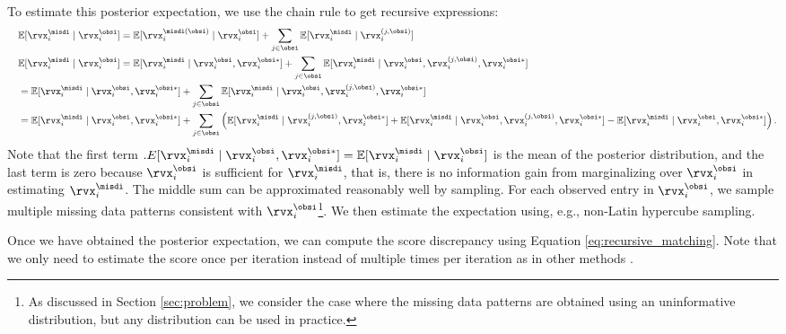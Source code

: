 \documentclass{article} %
\begin{document}
To estimate this posterior expectation, we use the chain rule to get recursive expressions:
\begin{align}
	& \quad \mathbb{E}[\rvx_{i}^{\misdi} \mid \rvx_{i}^{\obsi} ] = \mathbb{E}[\rvx_{i}^{\misdi(\obsi)} \mid \rvx_{i}^{\obsi}] + \sum_{j \in \obsi} \mathbb{E}[\rvx_{i}^{\misdi} \mid \rvx_{i}^{(j, \obsi)}] \label{eq:recursive_matching_posterior_expectation} \\ 
	&\quad \mathbb{E}[\rvx_{i}^{\misdi} \mid \rvx_{i}^{\obsi}] = \mathbb{E}[\rvx_{i}^{\misdi} \mid \rvx_{i}^{\obsi}, \rvx_{i}^{\obsi*} ] + \sum_{j \in \obsi} \mathbb{E}[\rvx_{i}^{\misdi} \mid \rvx_{i}^{\obsi}, \rvx_{i}^{(j, \obsi)},  \rvx_{i}^{\obsi*} ] \notag \\
    &\quad = \mathbb{E}[\rvx_{i}^{\misdi} \mid \rvx_{i}^{\obsi}, \rvx_{i}^{\obsi*} ] + \sum_{j \in \obsi}  \mathbb{E}[\rvx_{i}^{\misdi} \mid \rvx_{i}^{\obsi}, \rvx_{i}^{(j, \obsi)},  \rvx_{i}^{\obsi*} ] \notag \\
	&\quad = \mathbb{E}[\rvx_{i}^{\misdi} \mid \rvx_{i}^{\obsi}, \rvx_{i}^{\obsi*} ] + \sum_{j \in \obsi}  \left( \mathbb{E}[\rvx_{i}^{\misdi} \mid \rvx_{i}^{(j, \obsi)},  \rvx_{i}^{\obsi*} ] + \mathbb{E}[\rvx_{i}^{\misdi} \mid \rvx_{i}^{\obsi}, \rvx_{i}^{(j, \obsi)},  \rvx_{i}^{\obsi*} ] - \mathbb{E}[\rvx_{i}^{\misdi} \mid \rvx_{i}^{\obsi},  \rvx_{i}^{\obsi*} ] \right). \notag
\end{align}
Note that the first term $\mathbb.E[\rvx_{i}^{\misdi} \mid \rvx_{i}^{\obsi}, \rvx_{i}^{\obsi*} ] = \mathbb{E}[\rvx_{i}^{\misdi} \mid \rvx_{i}^{\obsi}]$ is the mean of the posterior distribution, and the last term is zero because $\rvx_{i}^{\obsi}$ is sufficient for $\rvx_{i}^{\misdi}$, that is, there is no information gain from marginalizing over $\rvx_{i}^{\obsi}$ in estimating $\rvx_{i}^{\misdi}$. The middle sum can be approximated reasonably well by sampling. For each observed entry in $\rvx_{i}^{\obsi}$, we sample multiple missing data patterns consistent with $\rvx_{i}^{\obsi}$\footnote{As discussed in Section \ref{sec:problem}, we consider the case where the missing data patterns are obtained using an uninformative distribution, but any distribution can be used in practice.}. We then estimate the expectation using, e.g., non-Latin hypercube sampling.

Once we have obtained the posterior expectation, we can compute the score discrepancy using Equation \eqref{eq:recursive_matching}. Note that we only need to estimate the score once per iteration instead of multiple times per iteration as in other methods \citep{Uehara2020}.
\end{document}
